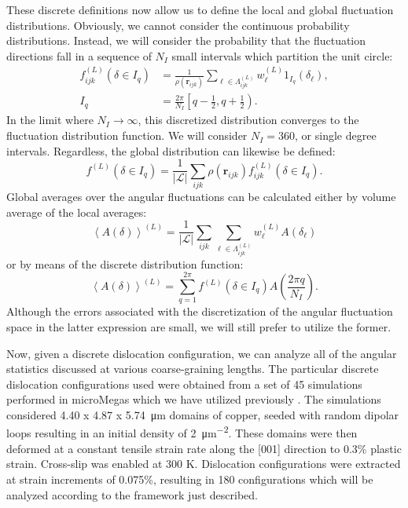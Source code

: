 These discrete definitions now allow us to define the local and global
fluctuation distributions. Obviously, we cannot consider the continuous
probability distributions. Instead, we will consider the probability that
the fluctuation directions fall in a sequence of \(N_{I}\) small
intervals which partition the unit circle:
\begin{subequations}
\begin{align}
    f_{ijk}^{(L)}\left( \delta \in I_{q} \right) &= \frac{1}{\rho\left( \boldsymbol{r}_{ijk} \right)}\sum_{\ell \in\Lambda_{ijk}^{(L)}}^{}{w_{\ell}^{(L)}1_{I_{q}}\left( \delta_{\ell} \right)},\\
     I_{q} &= \frac{2\pi}{N_{I}}\left\lbrack q - \frac{1}{2},q + \frac{1}{2} \right).
\end{align}
\end{subequations}
In the limit where \(N_{I} \rightarrow \infty\), this discretized
distribution converges to the fluctuation distribution function. We will
consider \(N_{I} = 360\), or single degree intervals. Regardless, the
global distribution can likewise be defined:
\begin{equation}
f^{(L)}\left( \delta \in I_{q} \right) = \frac{1}{\left| \mathcal{L} \right|}\sum_{ijk}^{}{\rho\left( \boldsymbol{r}_{ijk} \right)f_{ijk}^{(L)}\left( \delta \in I_{q} \right)}.
\end{equation}
Global averages over the angular fluctuations can be calculated either
by volume average of the local averages:
\begin{equation}\left\langle A(\delta) \right\rangle^{(L)} = \frac{1}{\left| \mathcal{L} \right|}\sum_{ijk}^{}{\sum_{\ell\in\Lambda_{ijk}^{(L)}}^{}{w_{\ell}^{(L)}A\left( \delta_{\ell} \right)}}\end{equation}
or by means of the discrete distribution function:
\begin{equation}\left\langle A(\delta) \right\rangle^{(L)} = \sum_{q = 1}^{2\pi}{f^{(L)}\left( \delta \in I_{q} \right)A\left( \frac{2\pi q}{N_{I}} \right)}.\end{equation}
Although the errors associated with the discretization of the angular
fluctuation space in the latter expression are small, we will still
prefer to utilize the former.

Now, given a discrete dislocation configuration, we can analyze all of
the angular statistics discussed at various coarse-graining lengths. The
particular discrete dislocation configurations used were obtained from a
set of 45 simulations performed in microMegas \cite{Devincre2011} which we have
utilized previously \cite{Anderson2021}. The simulations considered 4.40 x 4.87 x
\SI{5.74}{\micro\metre} domains of copper, seeded with random dipolar loops
resulting in an initial density of \SI{2}{\micro\metre^{-2}}. These domains were
then deformed at a {constant tensile strain rate along the [001] direction} to 0.3\% plastic strain. {Cross-slip was enabled at 300 K.} 
Dislocation configurations were extracted at strain increments of 0.075\%,
resulting in 180 configurations which will be analyzed according to the
framework just described.

